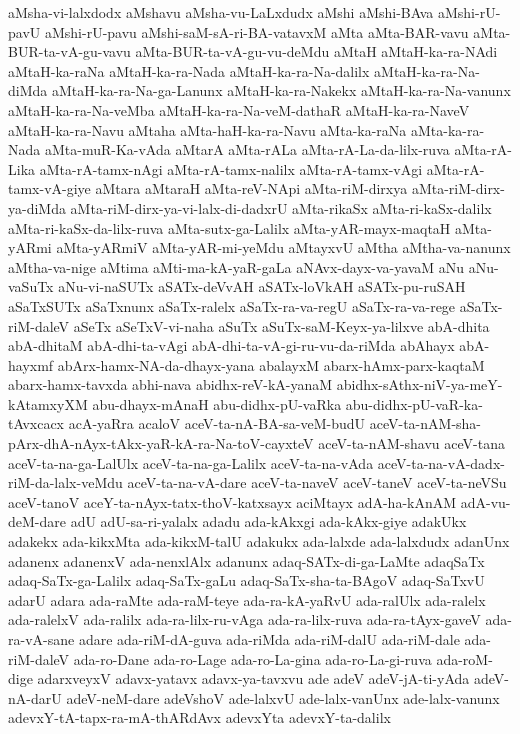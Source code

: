 {aMsha-vi-lalxdodx
aMshavu
aMsha-vu-LaLxdudx
aMshi
aMshi-BAva
aMshi-rU-pavU
aMshi-rU-pavu
aMshi-saM-sA-ri-BA-vatavxM
aMta
aMta-BAR-vavu
aMta-BUR-ta-vA-gu-vavu
aMta-BUR-ta-vA-gu-vu-deMdu
aMtaH
aMtaH-ka-ra-NAdi
aMtaH-ka-raNa
aMtaH-ka-ra-Nada
aMtaH-ka-ra-Na-dalilx
aMtaH-ka-ra-Na-diMda
aMtaH-ka-ra-Na-ga-Lanunx
aMtaH-ka-ra-Nakekx
aMtaH-ka-ra-Na-vanunx
aMtaH-ka-ra-Na-veMba
aMtaH-ka-ra-Na-veM-dathaR
aMtaH-ka-ra-NaveV
aMtaH-ka-ra-Navu
aMtaha
aMta-haH-ka-ra-Navu
aMta-ka-raNa
aMta-ka-ra-Nada
aMta-muR-Ka-vAda
aMtarA
aMta-rALa
aMta-rA-La-da-lilx-ruva
aMta-rA-Lika
aMta-rA-tamx-nAgi
aMta-rA-tamx-nalilx
aMta-rA-tamx-vAgi
aMta-rA-tamx-vA-giye
aMtara
aMtaraH
aMta-reV-NApi
aMta-riM-dirxya
aMta-riM-dirx-ya-diMda
aMta-riM-dirx-ya-vi-lalx-di-dadxrU
aMta-rikaSx
aMta-ri-kaSx-dalilx
aMta-ri-kaSx-da-lilx-ruva
aMta-sutx-ga-Lalilx
aMta-yAR-mayx-maqtaH
aMta-yARmi
aMta-yARmiV
aMta-yAR-mi-yeMdu
aMtayxvU
aMtha
aMtha-va-nanunx
aMtha-va-nige
aMtima
aMti-ma-kA-yaR-gaLa
aNAvx-dayx-va-yavaM
aNu
aNu-vaSuTx
aNu-vi-naSUTx
aSATx-deVvAH
aSATx-loVkAH
aSATx-pu-ruSAH
aSaTxSUTx
aSaTxnunx
aSaTx-ralelx
aSaTx-ra-va-regU
aSaTx-ra-va-rege
aSaTx-riM-daleV
aSeTx
aSeTxV-vi-naha
aSuTx
aSuTx-saM-Keyx-ya-lilxve
abA-dhita
abA-dhitaM
abA-dhi-ta-vAgi
abA-dhi-ta-vA-gi-ru-vu-da-riMda
abAhayx
abA-hayxmf
abArx-hamx-NA-da-dhayx-yana
abalayxM
abarx-hAmx-parx-kaqtaM
abarx-hamx-tavxda
abhi-nava
abidhx-reV-kA-yanaM
abidhx-sAthx-niV-ya-meY-kAtamxyXM
abu-dhayx-mAnaH
abu-didhx-pU-vaRka
abu-didhx-pU-vaR-ka-tAvxcacx
acA-yaRra
acaloV
aceV-ta-nA-BA-sa-veM-budU
aceV-ta-nAM-sha-pArx-dhA-nAyx-tAkx-yaR-kA-ra-Na-toV-cayxteV
aceV-ta-nAM-shavu
aceV-tana
aceV-ta-na-ga-LalUlx
aceV-ta-na-ga-Lalilx
aceV-ta-na-vAda
aceV-ta-na-vA-dadx-riM-da-lalx-veMdu
aceV-ta-na-vA-dare
aceV-ta-naveV
aceV-taneV
aceV-ta-neVSu
aceV-tanoV
aceY-ta-nAyx-tatx-thoV-katxsayx
aciMtayx
adA-ha-kAnAM
adA-vu-deM-dare
adU
adU-sa-ri-yalalx
adadu
ada-kAkxgi
ada-kAkx-giye
adakUkx
adakekx
ada-kikxMta
ada-kikxM-talU
adakukx
ada-lalxde
ada-lalxdudx
adanUnx
adanenx
adanenxV
ada-nenxlAlx
adanunx
adaq-SATx-di-ga-LaMte
adaqSaTx
adaq-SaTx-ga-Lalilx
adaq-SaTx-gaLu
adaq-SaTx-sha-ta-BAgoV
adaq-SaTxvU
adarU
adara
ada-raMte
ada-raM-teye
ada-ra-kA-yaRvU
ada-ralUlx
ada-ralelx
ada-ralelxV
ada-ralilx
ada-ra-lilx-ru-vAga
ada-ra-lilx-ruva
ada-ra-tAyx-gaveV
ada-ra-vA-sane
adare
ada-riM-dA-guva
ada-riMda
ada-riM-dalU
ada-riM-dale
ada-riM-daleV
ada-ro-Dane
ada-ro-Lage
ada-ro-La-gina
ada-ro-La-gi-ruva
ada-roM-dige
adarxveyxV
adavx-yatavx
adavx-ya-tavxvu
ade
adeV
adeV-jA-ti-yAda
adeV-nA-darU
adeV-neM-dare
adeVshoV
ade-lalxvU
ade-lalx-vanUnx
ade-lalx-vanunx
adevxY-tA-tapx-ra-mA-thARdAvx
adevxYta
adevxY-ta-dalilx
}
